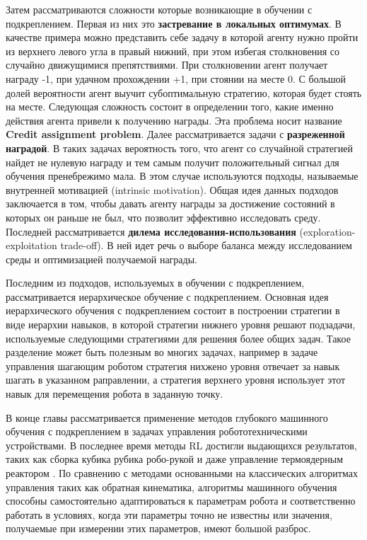 Затем рассматриваются сложности которые возникающие в обучении с подкреплением. Первая из них это \textbf{застревание в локальных оптимумах}. В качестве примера можно представить себе задачу в которой агенту нужно пройти из верхнего левого угла в правый нижний, при этом избегая столкновения со случайно движущимися препятствиями. При столкновении агент получает награду -1, при удачном прохождении +1, при стоянии на месте 0. С большой долей вероятности агент выучит субоптимальную стратегию, которая будет стоять на месте. Следующая сложность состоит в определении того, какие именно действия агента привели к получению награды. Эта проблема носит название \textbf{Credit assignment problem}. Далее рассматривается задачи с \textbf{разреженной наградой}. В таких задачах вероятность того, что агент со случайной стратегией найдет не нулевую награду и тем самым получит положительный сигнал для обучения пренебрежимо мала. В этом случае используются подходы, называемые внутренней мотивацией (intrinsic motivation). Общая идея данных подходов заключается в том, чтобы давать агенту награды за достижение состояний в которых он раньше не был, что позволит эффективно исследовать среду. Последней рассматривается \textbf{дилема исследования-использования} (exploration-exploitation trade-off). В ней идет речь о выборе баланса между исследованием среды и оптимизацией получаемой награды. 

Последним из подходов, используемых в обучении с подкреплением, рассматривается иерархическое обучение с подкреплением. Основная идея иерархического обучения с подкреплением состоит в построении стратегии в виде иерархии навыков, в которой стратегии нижнего уровня решают подзадачи, используемые следующими стратегиями для решения более общих задач. Такое разделение может быть полезным во многих задачах, например в задаче управления шагающим роботом стратегия нихжено уровня отвечает за навык шагать в указанном раправлении, а стратегия верхнего уровня использует этот навык для перемещения робота в заданную точку. 

В конце главы рассматривается применение методов глубокого машинного обучения с подкреплением в задачах управления робототехническими устройствами. В последнее время методы RL достигли выдающихся результатов, таких как сборка кубика рубика робо-рукой \cite{rubic} и даже управление термоядерным реактором \cite{tokomak}. По сравнению с методами основанными на классических алгоритмах управления таких как обратная кинематика, алгоритмы машинного обучения способны самостоятельно адаптироваться к параметрам робота и соответственно работать в условиях, когда эти параметры точно не известны или значения, получаемые при измерении этих параметров, имеют большой разброс. 

